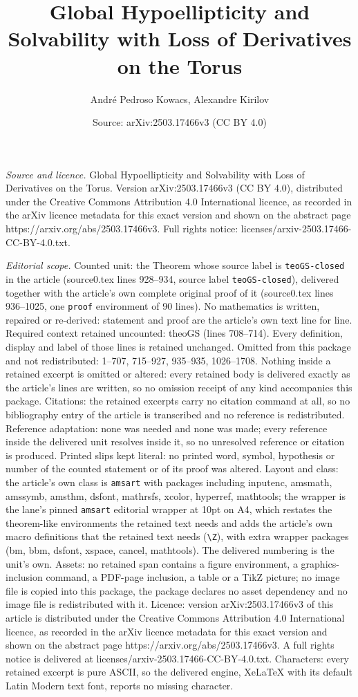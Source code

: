 \documentclass[10pt,a4paper]{amsart}
\title[Global Hypoellipticity and Solvability with Loss of Derivati]{Global Hypoellipticity and Solvability with Loss of Derivatives on the Torus}
\author{Andr\'e Pedroso Kowacs, Alexandre Kirilov}
\date{Source: arXiv:2503.17466v3 (CC BY 4.0)}
\begin{document}
\maketitle

\noindent\emph{Source and licence.} Global Hypoellipticity and Solvability with Loss of Derivatives on the Torus. Version arXiv:2503.17466v3 (CC BY 4.0), distributed under the Creative Commons Attribution 4.0 International licence, as recorded in the arXiv licence metadata for this exact version and shown on the abstract page https://arxiv.org/abs/2503.17466v3. Full rights notice: licenses/arxiv-2503.17466-CC-BY-4.0.txt.\par\smallskip

\noindent\textit{Editorial scope.} Counted unit: the Theorem whose source label is \texttt{teoGS-closed} in the article (source0.tex lines 928--934, source label \texttt{teoGS-closed}), delivered together with the article's own complete original proof of it (source0.tex lines 936--1025, one \texttt{proof} environment of 90 lines). No mathematics is written, repaired or re-derived: statement and proof are the article's own text line for line. Required context retained uncounted: theoGS (lines 708--714). Every definition, display and label of those lines is retained unchanged. Omitted from this package and not redistributed: 1--707, 715--927, 935--935, 1026--1708. Nothing inside a retained excerpt is omitted or altered: every retained body is delivered exactly as the article's lines are written, so no omission receipt of any kind accompanies this package. Citations: the retained excerpts carry no citation command at all, so no bibliography entry of the article is transcribed and no reference is redistributed. Reference adaptation: none was needed and none was made; every reference inside the delivered unit resolves inside it, so no unresolved reference or citation is produced. Printed slips kept literal: no printed word, symbol, hypothesis or number of the counted statement or of its proof was altered. Layout and class: the article's own class is \texttt{amsart} with packages including inputenc, amsmath, amssymb, amsthm, dsfont, mathrsfs, xcolor, hyperref, mathtools; the wrapper is the lane's pinned \texttt{amsart} editorial wrapper at 10pt on A4, which restates the theorem-like environments the retained text needs and adds the article's own macro definitions that the retained text needs (\texttt{\textbackslash Z}), with extra wrapper packages (bm, bbm, dsfont, xspace, cancel, mathtools). The delivered numbering is the unit's own. Assets: no retained span contains a figure environment, a graphics-inclusion command, a PDF-page inclusion, a table or a TikZ picture; no image file is copied into this package, the package declares no asset dependency and no image file is redistributed with it. Licence: version arXiv:2503.17466v3 of this article is distributed under the Creative Commons Attribution 4.0 International licence, as recorded in the arXiv licence metadata for this exact version and shown on the abstract page https://arxiv.org/abs/2503.17466v3. A full rights notice is delivered at licenses/arxiv-2503.17466-CC-BY-4.0.txt. Characters: every retained excerpt is pure ASCII, so the delivered engine, XeLaTeX with its default Latin Modern text font, reports no missing character.
\end{document}
